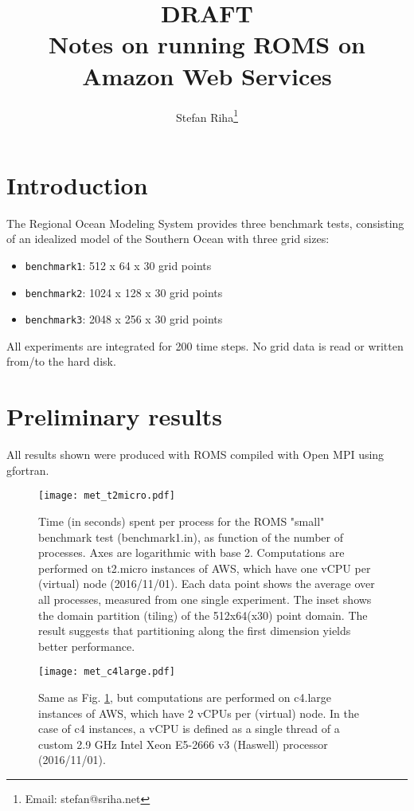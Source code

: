 \documentclass[12pt,a4paper]{article}
\title{
	{\bf DRAFT}\\
	Notes on running ROMS on Amazon Web Services 
}
\author{Stefan Riha\thanks{Email: stefan@sriha.net}}
\begin{document}
	\setlength{\parindent}{0cm}
	\maketitle
	
\section{Introduction}

The Regional Ocean Modeling System \citep[ROMS, see ][]{shchepetkin2005regional} provides three benchmark tests, consisting of 
an idealized model of the Southern Ocean with three grid sizes:

\begin{itemize}
	\item \verb|benchmark1|:   512 x 64 x 30 grid points
	\item \verb|benchmark2|:   1024 x 128 x 30 grid points
	\item \verb|benchmark3|:   2048 x 256 x 30 grid points
\end{itemize}

All experiments are integrated for 200 time steps. No grid data is read or written from/to the hard disk.

\section{Preliminary results}
	All results shown were produced with ROMS compiled with Open MPI using gfortran.
	
	\begin{figure}[H]
		\centering
		\texttt{[image: met\_t2micro.pdf]}
		\caption{Time (in seconds) spent per process for the ROMS "small" benchmark test (benchmark1.in), as function of the number of processes. Axes are logarithmic with base 2. Computations are performed on t2.micro instances of AWS, which have one vCPU per (virtual) node (2016/11/01). Each data point shows the average over all processes, measured from one single experiment. The inset shows the domain partition (tiling) of the 512x64(x30) point domain. The result suggests that partitioning along the first dimension yields better performance.}
		\label{fig:met_t2micro}
	\end{figure}

	\begin{figure}[H]
	\centering
	\texttt{[image: met\_c4large.pdf]}
	\caption{Same as Fig. \ref{fig:met_t2micro}, but computations are performed on c4.large instances of AWS, which have 2 vCPUs per (virtual) node. In the case of c4 instances, a vCPU is defined as a single thread of a custom 2.9 GHz Intel Xeon E5-2666 v3 (Haswell) processor (2016/11/01).}
	\label{fig:met_c4large}
\end{figure}
\end{document}
